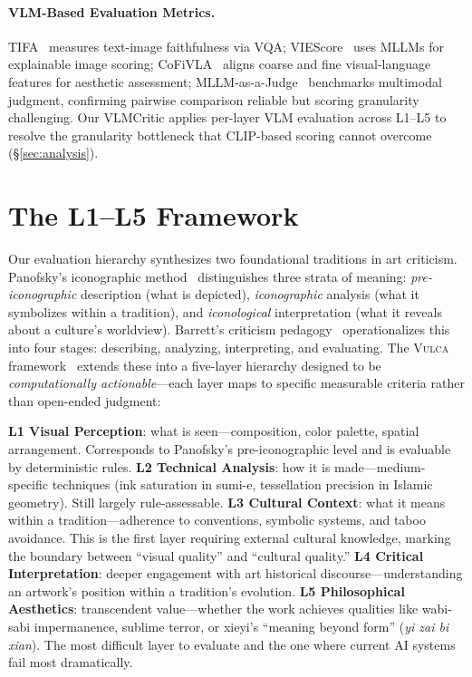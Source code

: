 \documentclass[sigconf, screen, review, anonymous]{acmart}
\newcommand{\vulca}{\textsc{Vulca}}
\newcommand{\Lx}[1]{L#1}
\begin{document}
\paragraph{VLM-Based Evaluation Metrics.}
TIFA~\cite{hu2023tifa} measures text-image faithfulness via VQA; VIEScore~\cite{ku2024viescore} uses MLLMs for explainable image scoring; CoFiVLA~\cite{niu2025cofivla} aligns coarse and fine visual-language features for aesthetic assessment; MLLM-as-a-Judge~\cite{chen2024mllmjudge} benchmarks multimodal judgment, confirming pairwise comparison reliable but scoring granularity challenging.
Our VLMCritic applies per-layer VLM evaluation across \Lx{1}--\Lx{5} to resolve the granularity bottleneck that CLIP-based scoring cannot overcome (\S\ref{sec:analysis}).

\section{The \Lx{1}--\Lx{5} Framework}
\label{sec:framework}

Our evaluation hierarchy synthesizes two foundational traditions in art criticism.
Panofsky's iconographic method~\cite{panofsky1939studies} distinguishes three strata of meaning: \emph{pre-iconographic} description (what is depicted), \emph{iconographic} analysis (what it symbolizes within a tradition), and \emph{iconological} interpretation (what it reveals about a culture's worldview).
Barrett's criticism pedagogy~\cite{barrett2011criticizing} operationalizes this into four stages: describing, analyzing, interpreting, and evaluating.
The \vulca{} framework~\cite{yu2025vulcabench} extends these into a five-layer hierarchy designed to be \emph{computationally actionable}---each layer maps to specific measurable criteria rather than open-ended judgment:

\noindent
\textbf{\Lx{1} Visual Perception}: what is seen---composition, color palette, spatial arrangement. Corresponds to Panofsky's pre-iconographic level and is evaluable by deterministic rules.
\textbf{\Lx{2} Technical Analysis}: how it is made---medium-specific techniques (ink saturation in sumi-e, tessellation precision in Islamic geometry). Still largely rule-assessable.
\textbf{\Lx{3} Cultural Context}: what it means within a tradition---adherence to conventions, symbolic systems, and taboo avoidance. This is the first layer requiring external cultural knowledge, marking the boundary between ``visual quality'' and ``cultural quality.''
\textbf{\Lx{4} Critical Interpretation}: deeper engagement with art historical discourse---understanding an artwork's position within a tradition's evolution.
\textbf{\Lx{5} Philosophical Aesthetics}: transcendent value---whether the work achieves qualities like wabi-sabi impermanence, sublime terror, or xieyi's ``meaning beyond form'' (\emph{yi zai bi xian}). The most difficult layer to evaluate and the one where current AI systems fail most dramatically.
\end{document}
